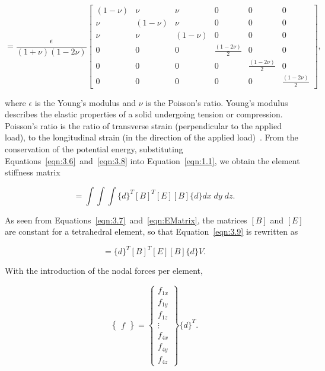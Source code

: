 \begin{equation}
[E]
 =
 \frac{\epsilon}{(1 + \nu)(1 - 2\nu)}
\begin{bmatrix}
(1 - \nu) & \nu & \nu & 0 & 0 & 0 \\
\nu & (1 - \nu) & \nu & 0 & 0 & 0 \\
\nu & \nu & (1 - \nu) & 0 & 0 & 0 \\
0 & 0 & 0 & \frac{(1 - 2\nu)}{2} & 0 & 0 \\
0 & 0 & 0 & 0 & \frac{(1 - 2\nu)}{2} & 0 \\
0 & 0 & 0 & 0 & 0 & \frac{(1 - 2\nu)}{2}
\end{bmatrix},
\label{eqn:EMatrix}
\end{equation}

\noindent where $\epsilon$ is the Young's modulus and $\nu$ is the Poisson's ratio. Young's modulus describes the elastic properties of a solid undergoing tension or compression. Poisson's ratio is the ratio of transverse strain (perpendicular to the applied load), to the longitudinal strain (in the direction of the applied load)~\cite{Modulus2011}. From the conservation of the potential energy, substituting Equations~\ref{eqn:3.6}~and~\ref{eqn:3.8} into Equation~\ref{eqn:1.1}, we obtain the element stiffness matrix


\begin{equation}
[k] = \int\int\int\{d\}^T[B]^T[E][B]\{d\} dx \; dy \; dz.
\label{eqn:3.9}
\end{equation}

\noindent As seen from Equations~\ref{eqn:3.7}~and~\ref{eqn:EMatrix}, the matrices $[B]$ and $[E]$ are constant for a tetrahedral element, so that Equation~\ref{eqn:3.9} is rewritten as

\begin{equation}
[k] = \{d\}^T[B]^T[E][B]\{d\} V .
\label{eqn:3.10}
\end{equation}

\noindent With the introduction of the nodal forces per element,

\begin{equation}
\begin{Bmatrix}
 f
 \end{Bmatrix}
 =
\begin{Bmatrix}
f_{1x} \\ f_{1y} \\ f_{1z} \\ \vdots \\ f_{4x} \\ f_{4y} \\ f_{4z}
\end{Bmatrix}
\{d\}^T.
\label{eqn:3.11}
\end{equation}


